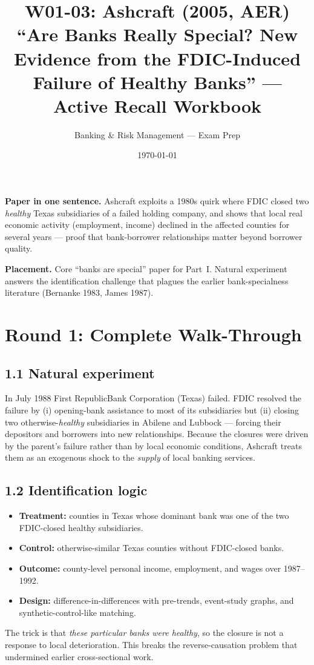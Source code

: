 \documentclass[11pt]{article}
\title{W01-03: Ashcraft (2005, AER) \\
\large ``Are Banks Really Special? New Evidence from the FDIC-Induced Failure of Healthy Banks'' --- Active Recall Workbook}
\author{Banking \& Risk Management --- Exam Prep}
\date{\today}
\begin{document}
\maketitle

\begin{keybox}
\textbf{Paper in one sentence.} Ashcraft exploits a 1980s quirk where FDIC closed two \emph{healthy} Texas subsidiaries of a failed holding company, and shows that local real economic activity (employment, income) declined in the affected counties for several years --- proof that bank-borrower relationships matter beyond borrower quality.

\textbf{Placement.} Core ``banks are special'' paper for Part~I. Natural experiment answers the identification challenge that plagues the earlier bank-specialness literature (Bernanke 1983, James 1987).
\end{keybox}

\section*{Round 1: Complete Walk-Through}

\subsection*{1.1 Natural experiment}
In July 1988 First RepublicBank Corporation (Texas) failed. FDIC resolved the failure by (i) opening-bank assistance to most of its subsidiaries but (ii) closing two otherwise-\emph{healthy} subsidiaries in Abilene and Lubbock --- forcing their depositors and borrowers into new relationships. Because the closures were driven by the parent's failure rather than by local economic conditions, Ashcraft treats them as an exogenous shock to the \emph{supply} of local banking services.

\subsection*{1.2 Identification logic}
\begin{itemize}
\item \textbf{Treatment:} counties in Texas whose dominant bank was one of the two FDIC-closed healthy subsidiaries.
\item \textbf{Control:} otherwise-similar Texas counties without FDIC-closed banks.
\item \textbf{Outcome:} county-level personal income, employment, and wages over 1987--1992.
\item \textbf{Design:} difference-in-differences with pre-trends, event-study graphs, and synthetic-control-like matching.
\end{itemize}
The trick is that \emph{these particular banks were healthy}, so the closure is not a response to local deterioration. This breaks the reverse-causation problem that undermined earlier cross-sectional work.
\end{document}
